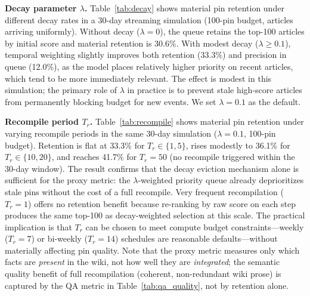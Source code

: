 \documentclass{article}
\begin{document}
\textbf{Decay parameter $\lambda$.}
Table~\ref{tab:decay} shows material pin retention under different decay rates in a 30-day streaming simulation (100-pin budget, articles arriving uniformly).
Without decay ($\lambda = 0$), the queue retains the top-100 articles by initial score and material retention is 30.6\%.
With modest decay ($\lambda \geq 0.1$), temporal weighting slightly improves both retention (33.3\%) and precision in queue (12.0\%), as the model places relatively higher priority on recent articles, which tend to be more immediately relevant.
The effect is modest in this simulation; the primary role of $\lambda$ in practice is to prevent stale high-score articles from permanently blocking budget for new events.
We set $\lambda = 0.1$ as the default.

\textbf{Recompile period $T_r$.}
Table~\ref{tab:recompile} shows material pin retention under varying recompile periods in the same 30-day simulation ($\lambda = 0.1$, 100-pin budget).
Retention is flat at 33.3\% for $T_r \in \{1, 5\}$, rises modestly to 36.1\% for $T_r \in \{10, 20\}$, and reaches 41.7\% for $T_r = 50$ (no recompile triggered within the 30-day window).
The result confirms that the decay eviction mechanism alone is sufficient for the proxy metric: the $\lambda$-weighted priority queue already deprioritizes stale pins without the cost of a full recompile.
Very frequent recompilation ($T_r = 1$) offers no retention benefit because re-ranking by raw score on each step produces the same top-100 as decay-weighted selection at this scale.
The practical implication is that $T_r$ can be chosen to meet compute budget constraints---weekly ($T_r = 7$) or bi-weekly ($T_r = 14$) schedules are reasonable defaults---without materially affecting pin quality.
Note that the proxy metric measures only which facts are \emph{present} in the wiki, not how well they are \emph{integrated}; the semantic quality benefit of full recompilation (coherent, non-redundant wiki prose) is captured by the QA metric in Table~\ref{tab:qa_quality}, not by retention alone.
\end{document}
